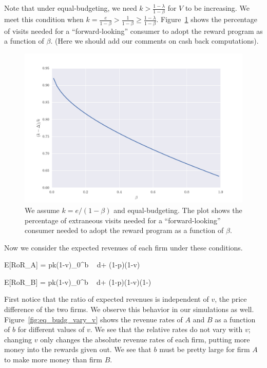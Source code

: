 Note that under equal-budgeting, we need $k > \frac{1-\lambda}{1-\beta}$ for $V$ to be increasing. We meet this condition when $k = \frac{e}{1-\beta} > \frac{1}{1-\beta} \geq \frac{1-\lambda}{1-\beta}$. Figure~\ref{fig:phase_trans} shows the percentage of visits needed for a ``forward-looking'' consumer to adopt the reward program as a function of $\beta$. (Here we should add our comments on cash back computations).

\begin{figure}[h!]
\begin{centering}
\includegraphics[scale = 0.75]{./figures/phase_trans.pdf}
\caption{We assume $k = e/(1-\beta)$ and equal-budgeting. The plot shows the percentage of extraneous visits needed for a ``forward-looking'' consumer needed to adopt the reward program as a function of $\beta$.}
\label{fig:phase_trans}
\end{centering}
\end{figure}

Now we consider the expected revenues of each firm under these conditions.

\beq
{}E[RoR_A] = pk(1-v)\int_0^b  \mbox{ } d\lambda + (1-p)(1-v)
\eeq

\beq
{}E[RoR_B] = pk(1-v)\int_0^b  \mbox{ } d\lambda + (1-p)(1-v)\left(1-\right)
\eeq

First notice that the ratio of expected revenues is independent of $v$, the price difference of the two firms. We observe this behavior in our simulations as well. Figure~\ref{fig:eq_budg_vary_v} shows the revenue rates of $A$ and $B$ as a function of $b$ for different values of $v$. We see that the relative rates do not vary with $v$; changing $v$ only changes the absolute revenue rates of each firm, putting more money into the rewards given out. We see that $b$ must be pretty large for firm $A$ to make more money than firm $B$. 

